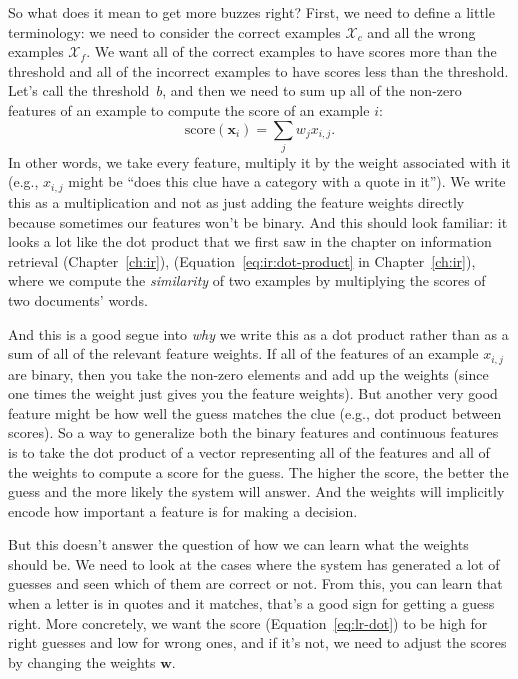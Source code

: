 So what does it mean to get more buzzes right?  First, we need to define a
little terminology: we need to consider the correct examples $\mathcal{X}_c$
and all the wrong examples $\mathcal{X}_f$.
%
We want all of the correct examples to have scores more than the threshold and
all of the incorrect examples to have scores less than the threshold.
%
Let's call the threshold~$b$, and then we need to sum up all of the non-zero
features of an example to compute the score of an example $i$:
\begin{equation}
  \mbox{score}({\bm x}_i) = \sum_{j} w_j x_{i,j}.
  \label{eq:lr-dot}
\end{equation}
In other words, we take every feature, multiply it by the weight associated
with it (e.g., $x_{i,j}$ might be ``does this clue have a category with a quote
in it'').
%
We write this as a multiplication and not as just adding the feature weights
directly because sometimes our features won't be binary.
%
And this should look familiar: it looks a lot like the dot product that we
first saw in the chapter on information retrieval
\ifproposal
(Chapter~\ref{ch:ir}),
\else
(Equation~\ref{eq:ir:dot-product} in Chapter~\ref{ch:ir}),
\fi
where we compute the \emph{similarity} of
two examples by multiplying the \tfidf{} scores of two documents' words.

And this is a good segue into \emph{why} we write this as a dot product rather
than as a sum of all of the relevant feature weights.
%
If all of the features of an example $x_{i,j}$ are binary, then you take the
non-zero elements and add up the weights (since one times the weight just
gives you the feature weights).
%
But another very good feature might be how well the guess matches the clue
(e.g., dot product between \tfidf{} scores).
%
So a way to generalize both the binary features and continuous features is to
take the dot product of a vector representing all of the features and all of
the weights to compute a score for the guess.
%
The higher the score, the better the guess and the more likely the system will
answer.
%
And the weights will implicitly encode how important a feature is for
making a decision.

But this doesn't answer the question of how we can learn what the weights
should be.
%
We need to look at the cases where the system has generated a lot of guesses
and seen which of them are correct or not.
%
From this, you can learn that when
a letter is in quotes and it matches, that’s a good sign for getting a guess right.
%
More concretely, we want the score (Equation~\ref{eq:lr-dot}) to be high for
right guesses and low for wrong ones, and if it's not, we need to adjust the
scores by changing the weights ${\bm w}$.

